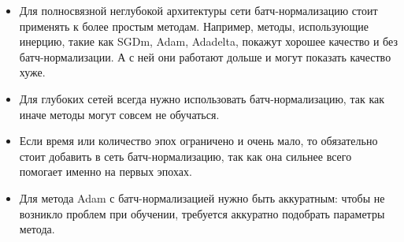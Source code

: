 \documentclass[12pt]{article}
\begin{document}
\begin{itemize}
\item Для полносвязной неглубокой архитектуры сети батч-нормализацию стоит применять к более простым методам. Например, методы, использующие инерцию, такие как SGDm, Adam, Adadelta, покажут хорошее качество и без батч-нормализации. А с ней они работают дольше и могут показать качество хуже.
\item Для глубоких сетей всегда нужно использовать батч-нормализацию, так как иначе методы могут совсем не обучаться.
\item Если время или количество эпох ограничено и очень мало, то обязательно стоит добавить в сеть батч-нормализацию, так как она сильнее всего помогает именно на первых эпохах.
\item Для метода Adam с батч-нормализацией нужно быть аккуратным: чтобы не возникло проблем при обучении, требуется аккуратно подобрать параметры метода.
\end{itemize}
\end{document}
